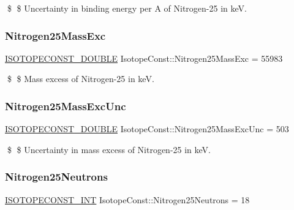 \$ \$ Uncertainty in binding energy per A of Nitrogen-\/25 in keV. \mbox{\label{group___isotope_const-_nitrogen-_n25_gaff9abc8665fb54008b8a01577d60c3a1}} 
\subsubsection{\texorpdfstring{Nitrogen25\+Mass\+Exc}{Nitrogen25MassExc}}
{\footnotesize\ttfamily \mbox{\hyperlink{group___isotope_const-_macros_ga8f45a7272ce02c0b4c65c44636ed719a}{I\+S\+O\+T\+O\+P\+E\+C\+O\+N\+S\+T\+\_\+\+D\+O\+U\+B\+LE}} Isotope\+Const\+::\+Nitrogen25\+Mass\+Exc = 55983}

\$ \$ Mass excess of Nitrogen-\/25 in keV. \mbox{\label{group___isotope_const-_nitrogen-_n25_gaf69788f922c47e4a3ea6f9b94bc777a3}} 
\subsubsection{\texorpdfstring{Nitrogen25\+Mass\+Exc\+Unc}{Nitrogen25MassExcUnc}}
{\footnotesize\ttfamily \mbox{\hyperlink{group___isotope_const-_macros_ga8f45a7272ce02c0b4c65c44636ed719a}{I\+S\+O\+T\+O\+P\+E\+C\+O\+N\+S\+T\+\_\+\+D\+O\+U\+B\+LE}} Isotope\+Const\+::\+Nitrogen25\+Mass\+Exc\+Unc = 503}

\$ \$ Uncertainty in mass excess of Nitrogen-\/25 in keV. \mbox{\label{group___isotope_const-_nitrogen-_n25_ga32e518430646b601cda83c3145171c98}} 
\subsubsection{\texorpdfstring{Nitrogen25\+Neutrons}{Nitrogen25Neutrons}}
{\footnotesize\ttfamily \mbox{\hyperlink{group___isotope_const-_macros_ga5f18360b3e99483a35c32d789e62621c}{I\+S\+O\+T\+O\+P\+E\+C\+O\+N\+S\+T\+\_\+\+I\+NT}} Isotope\+Const\+::\+Nitrogen25\+Neutrons = 18}


